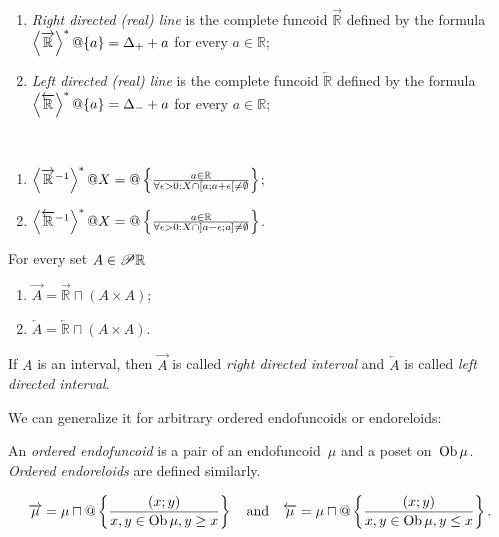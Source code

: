 \begin{defn}~
\begin{enumerate}
\item \emph{Right directed (real) line} is the complete funcoid $\overrightarrow{\mathbb{R}}$ defined by the formula
$\left\langle \overrightarrow{\mathbb{R}}\right\rangle ^{\ast}@\{a\} = \Delta_{+} + a$ for every $a\in\mathbb{R}$;
\item \emph{Left directed (real) line} is the complete funcoid $\overleftarrow{\mathbb{R}}$ defined by the formula
$\left\langle \overleftarrow{\mathbb{R}}\right\rangle ^{\ast}@\{a\} = \Delta_{-} + a$ for every $a\in\mathbb{R}$;
\end{enumerate}
\end{defn}

\begin{xca}~
\begin{enumerate}
\item $\left\langle \overrightarrow{\mathbb{R}}^{-1}\right\rangle ^{\ast}@X = @\left\{ \frac{a\in\mathbb{R}}{\forall\epsilon>0:X\cap[a;a+\epsilon[\ne\emptyset}\right\}$;
\item $\left\langle \overleftarrow{\mathbb{R}}^{-1}\right\rangle ^{\ast}@X = @\left\{ \frac{a\in\mathbb{R}}{\forall\epsilon>0:X\cap]a-\epsilon;a]\ne\emptyset}\right\}$.
\end{enumerate}
\end{xca}

\begin{defn}
For every set $A\in\mathscr{P}\mathbb{R}$
\begin{enumerate}
\item $\overrightarrow{A} = \overrightarrow{\mathbb{R}} \sqcap(A\times A)$;
\item $\overleftarrow{A} = \overleftarrow{\mathbb{R}} \sqcap(A\times A)$.
\end{enumerate}
If $A$ is an interval, then $\overrightarrow{A}$ is called \emph{right directed interval} and $\overleftarrow{A}$ is called \emph{left directed interval}.
\end{defn}

We can generalize it for arbitrary ordered endofuncoids or endoreloids:

\begin{defn}
An \emph{ordered endofuncoid} is a pair of an endofuncoid~$\mu$ and a poset on~$\operatorname{Ob}\mu$.
\emph{Ordered endoreloids} are defined similarly.
\end{defn}

\[
\overrightarrow{\mu} = \mu \sqcap @\left\{ \frac{(x;y)}{x,y\in\operatorname{Ob}\mu, y\geq x}\right\}
\quad\text{and}\quad
\overleftarrow{\mu} = \mu \sqcap @\left\{ \frac{(x;y)}{x,y\in\operatorname{Ob}\mu, y\leq x}\right\}.
\]

